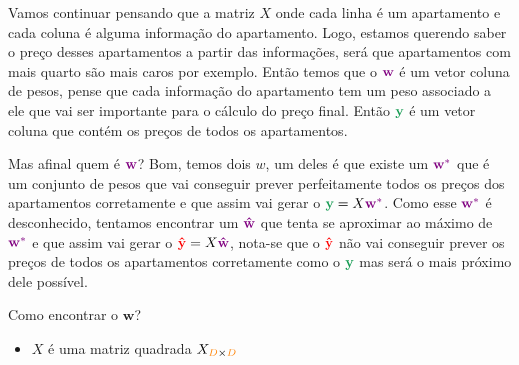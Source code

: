 Vamos continuar pensando que a matriz $X$  onde cada linha é um apartamento e cada coluna é alguma informação do apartamento. Logo, estamos querendo saber o preço desses apartamentos a partir das informações, será que apartamentos com mais quarto são mais caros por exemplo. Então temos que o $\mathbf{\mathcolor{violet}{w}}$ é um vetor coluna de pesos, pense que cada informação do apartamento tem um peso associado a ele que vai ser importante para o cálculo do preço final. Então $\mathbf{\mathcolor{ForestGreen}{y}}$ é um vetor coluna que contém os preços de todos os apartamentos.

Mas afinal quem é $\mathbf{\mathcolor{violet}{w}}$? Bom, temos dois $w$, um deles é que existe um $\mathbf{\mathcolor{violet}{w}^{\mathcolor{violet}{*}}}$ que é um conjunto de pesos que vai
conseguir prever perfeitamente todos os preços dos apartamentos corretamente e que assim vai gerar o $\mathbf{\mathcolor{ForestGreen}{y}} = X\mathbf{\mathcolor{violet}{w}}^{\mathcolor{violet}{*}}$. Como esse $\mathbf{\mathcolor{violet}{w}}^{\mathcolor{violet}{*}}$ é desconhecido,
tentamos encontrar um $\mathbf{\mathcolor{violet}{\hat{w}}}$ que tenta se aproximar ao máximo de $\mathbf{\mathcolor{violet}{w}^{\mathcolor{violet}{*}}}$ e que assim vai gerar o $\mathbf{\mathcolor{red}{\hat{y}}} = X\mathbf{\mathcolor{violet}{\hat{w}}}$, nota-se que o $\mathbf{\mathcolor{red}{\hat{y}}}$ não vai conseguir prever os preços de todos os apartamentos corretamente como o $\mathbf{\mathcolor{ForestGreen}{y}}$ mas será o mais próximo dele possível. 

Como encontrar o $\mathbf{w}$?

\begin{itemize}
    \item $X$ é uma matriz quadrada $X_{\mathcolor{orange}{D} \times \mathcolor{orange}{D}}$
\end{itemize}

